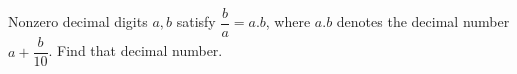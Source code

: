 Nonzero decimal digits $a,b$ satisfy $\dfrac{b}{a}=a.\!b$, where $a.\!b$ denotes the decimal number $a+\dfrac{b}{10}$. Find that decimal number.
